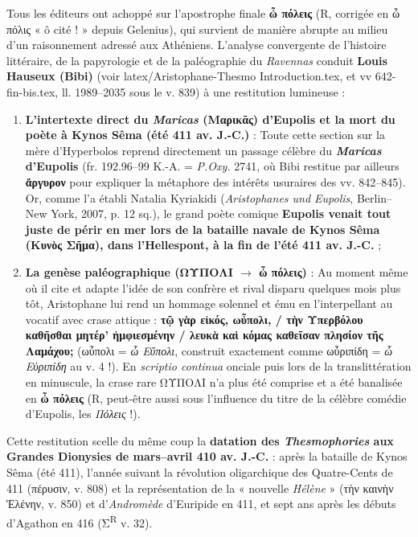 \documentclass[11pt, a4paper, twoside]{article}
\renewcommand{\_}{\origunderscore\penalty0\relax}
\renewcommand{\texttt}[1]{#1}
\newcommand{\R}{\textbf{R}}
\newcommand{\Bibi}{\textit{Bibi}}
\newcommand{\lecon}[1]{\textbf{#1}}
\def\R{R}%
\def\Bibi{Bibi}%
\begin{document}
Tous les éditeurs ont achoppé sur l'apostrophe finale \textbf{\texttt{ὦ πόλεις}} (\R{}, corrigée en \texttt{ὦ πόλις} « ô cité ! » depuis Gelenius), qui survient de manière abrupte au milieu d'un raisonnement adressé aux Athéniens.
L'analyse convergente de l'histoire littéraire, de la papyrologie et de la paléographie du \textit{Ravennas} conduit \textbf{Louis Hauseux (\Bibi{})} (voir \texttt{latex/Aristophane-Thesmo Introduction.tex}, et \texttt{vv 642-fin-bis.tex}, ll. 1989–2035 sous le v. 839) à une restitution lumineuse :
\begin{enumerate}[leftmargin=1.6em, itemsep=2pt]
  \item \textbf{L'intertexte direct du \textit{Maricas} (\texttt{Μαρικᾶς}) d'Eupolis et la mort du poète à Kynos Sêma (été 411 av. J.-C.)} : Toute cette section sur la mère d'Hyperbolos reprend directement un passage célèbre du \textbf{\textit{Maricas} d'Eupolis} (\texttt{fr. 192.96–99 K.-A.} = \textit{P.Oxy.} 2741, où \Bibi{} restitue par ailleurs \texttt{\lecon{ἄργυρον}} pour expliquer la métaphore des intérêts usuraires des vv. 842–845). Or, comme l'a établi Natalia Kyriakidi (\textit{Aristophanes und Eupolis}, Berlin–New York, 2007, p. 12 sq.), le grand poète comique \textbf{Eupolis venait tout juste de périr en mer lors de la bataille navale de Kynos Sêma (\texttt{Κυνὸς Σῆμα}), dans l'Hellespont, à la fin de l'été 411 av. J.-C.} ;
  \item \textbf{La genèse paléographique (\texttt{ΩΥΠΟΛΙ} $\to$ \texttt{ὦ πόλεις})} : Au moment même où il cite et adapte l'idée de son confrère et rival disparu quelques mois plus tôt, Aristophane lui rend un hommage solennel et ému en l'interpellant au vocatif avec crase attique : \textbf{\texttt{τῷ γὰρ εἰκός, ωὖπολι, / τὴν Υπερβόλου καθῆσθαι μητέρ' ἠμφιεσμένην / λευκὰ καὶ κόμας καθεῖσαν πλησίον τῆς Λαμάχου;}} (\texttt{ωὖπολι} = \textit{ὦ Εὔπολι}, construit exactement comme \texttt{ωὖριπίδη} = \textit{ὦ Εὐριπίδη} au v. 4 !). En \textit{scriptio continua} onciale puis lors de la translittération en minuscule, la crase rare \texttt{ΩΥΠΟΛΙ} n'a plus été comprise et a été banalisée en \textbf{\texttt{ὦ πόλεις}} (\R{}, peut-être aussi sous l'influence du titre de la célèbre comédie d'Eupolis, les \textit{Πόλεις} !).
\end{enumerate}
Cette restitution scelle du même coup la \textbf{datation des \textit{Thesmophories} aux Grandes Dionysies de mars–avril 410 av. J.-C.} : après la bataille de Kynos Sêma (été 411), l'année suivant la révolution oligarchique des Quatre-Cents de 411 (\texttt{πέρυσιν}, v. 808) et la représentation de la « nouvelle \textit{Hélène} » (\texttt{τὴν καινὴν Ἑλένην}, v. 850) et d'\textit{Andromède} d'Euripide en 411, et sept ans après les débuts d'Agathon en 416 (Σ\textsuperscript{R} v. 32).
\end{document}
